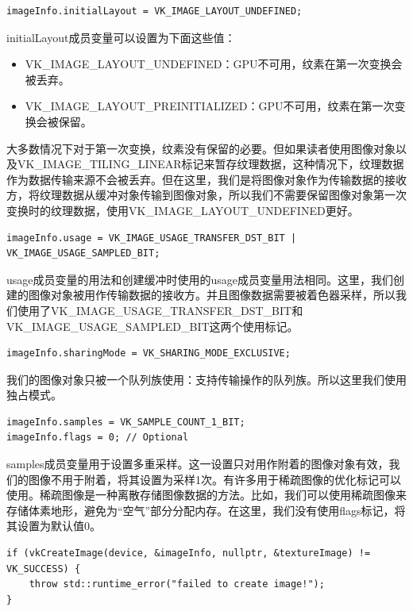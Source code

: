 \documentclass{ctexart}
\begin{document}
\begin{lstlisting}[language={[ANSI]C}]
imageInfo.initialLayout = VK_IMAGE_LAYOUT_UNDEFINED;
\end{lstlisting}

initialLayout成员变量可以设置为下面这些值：

\begin{itemize}
	\item VK\_IMAGE\_LAYOUT\_UNDEFINED：GPU不可用，纹素在第一次变换会被丢弃。
	\item VK\_IMAGE\_LAYOUT\_PREINITIALIZED：GPU不可用，纹素在第一次变换会被保留。
\end{itemize}

大多数情况下对于第一次变换，纹素没有保留的必要。但如果读者使用图像对象以及VK\_IMAGE\_TILING\_LINEAR标记来暂存纹理数据，这种情况下，纹理数据作为数据传输来源不会被丢弃。但在这里，我们是将图像对象作为传输数据的接收方，将纹理数据从缓冲对象传输到图像对象，所以我们不需要保留图像对象第一次变换时的纹理数据，使用VK\_IMAGE\_LAYOUT\_UNDEFINED更好。

\begin{lstlisting}[language={[ANSI]C}]
imageInfo.usage = VK_IMAGE_USAGE_TRANSFER_DST_BIT | VK_IMAGE_USAGE_SAMPLED_BIT;
\end{lstlisting}

usage成员变量的用法和创建缓冲时使用的usage成员变量用法相同。这里，我们创建的图像对象被用作传输数据的接收方。并且图像数据需要被着色器采样，所以我们使用了VK\_IMAGE\_USAGE\_TRANSFER\_DST\_BIT和VK\_IMAGE\_USAGE\_SAMPLED\_BIT这两个使用标记。

\begin{lstlisting}[language={[ANSI]C}]
imageInfo.sharingMode = VK_SHARING_MODE_EXCLUSIVE;
\end{lstlisting}

我们的图像对象只被一个队列族使用：支持传输操作的队列族。所以这里我们使用独占模式。

\begin{lstlisting}[language={[ANSI]C}]
imageInfo.samples = VK_SAMPLE_COUNT_1_BIT;
imageInfo.flags = 0; // Optional
\end{lstlisting}

samples成员变量用于设置多重采样。这一设置只对用作附着的图像对象有效，我们的图像不用于附着，将其设置为采样1次。有许多用于稀疏图像的优化标记可以使用。稀疏图像是一种离散存储图像数据的方法。比如，我们可以使用稀疏图像来存储体素地形，避免为“空气”部分分配内存。在这里，我们没有使用flags标记，将其设置为默认值0。

\begin{lstlisting}[language={[ANSI]C}]
if (vkCreateImage(device, &imageInfo, nullptr, &textureImage) != VK_SUCCESS) {
	throw std::runtime_error("failed to create image!");
}
\end{lstlisting}
\end{document}
